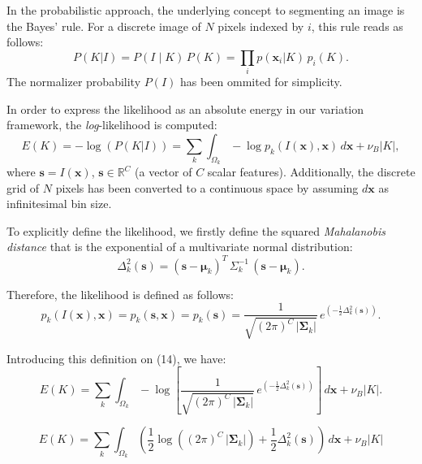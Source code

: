 In the probabilistic approach, the underlying concept to segmenting an image is the
Bayes' rule. For a discrete image of $N$ pixels indexed by $i$, this rule reads as
follows:
\begin{equation}
P(K|I)=P(I \mid K)\, P(K)=\underset{i}{\prod} p (\mathbf{x}_i | K ) \, p_i(K).
\end{equation}
The normalizer probability $P(I)$ has been ommited for simplicity.

In order to express the likelihood as an absolute energy in our variation framework,
the \textit{log}-likelihood is computed:
\begin{equation}
E(K)= -\log( P(K|I) ) = \sum\limits_k \int_{\Omega_k} -\log p_k(I(\mathbf{x}),\mathbf{x}) \,d\mathbf{x}+\nu_B \left|K\right|,
\end{equation}
where $\mathbf{s} = I(\mathbf{x})$, $\mathbf{s} \in \mathbb{R}^C$ (a vector of $C$ scalar features).
Additionally, the discrete grid of $N$ pixels has been converted to a continuous space by assuming
$d\mathbf{x}$ as infinitesimal bin size.

To explicitly define the likelihood, we firstly define the squared \textit{Mahalanobis distance} that
is the exponential of a multivariate normal distribution:
\begin{equation}
\Delta^2_k (\mathbf{s}) = (\mathbf{s} - \boldsymbol{\mu}_k)^T \, \Sigma^{-1}_k \, (\mathbf{s} - \boldsymbol{\mu}_k).
\end{equation}

Therefore, the likelihood is defined as follows:
\begin{equation}
p_k(I(\mathbf{x}),\mathbf{x}) = p_k(\mathbf{s},\mathbf{x})= p_k(\mathbf{s}) = \frac{1}{ \sqrt{(2\pi)^{C}\,\left|\boldsymbol{\Sigma}_{k}\right|}}\,{e^{\left(-\frac{1}{2}  \Delta^2_k (\mathbf{s}) \right)}}.
\end{equation}

Introducing this definition on (14), we have:
\begin{equation}
E(K)= \sum\limits_k \int_{\Omega_k} -\log{\left[ \frac{1}{ \sqrt{(2\pi)^{C}\,\left|\boldsymbol{\Sigma}_{k}\right|}}\,e^{\left(-\frac{1}{2}  \Delta^2_k (\mathbf{s}) \right)} \right] } \,d\mathbf{x}+\nu_B \left|K\right|.
\end{equation}

\begin{equation}
E(K) = \sum\limits_k \int_{\Omega_k} \left( \frac{1}{2} \log{ \left( (2\pi)^{C}\,\left|\boldsymbol{\Sigma}_{k}\right| \right)} + \frac{1}{2}  \Delta^2_k (\mathbf{s}) \right) \,d\mathbf{x}+\nu_B \left|K\right|
\end{equation}

